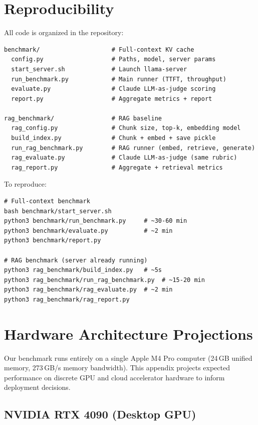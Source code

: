 \documentclass{article}
\begin{document}
\section{Reproducibility}
\label{app:reproduce}

All code is organized in the repository:

\begin{lstlisting}
benchmark/                    # Full-context KV cache
  config.py                   # Paths, model, server params
  start_server.sh             # Launch llama-server
  run_benchmark.py            # Main runner (TTFT, throughput)
  evaluate.py                 # Claude LLM-as-judge scoring
  report.py                   # Aggregate metrics + report

rag_benchmark/                # RAG baseline
  rag_config.py               # Chunk size, top-k, embedding model
  build_index.py              # Chunk + embed + save pickle
  run_rag_benchmark.py        # RAG runner (embed, retrieve, generate)
  rag_evaluate.py             # Claude LLM-as-judge (same rubric)
  rag_report.py               # Aggregate + retrieval metrics
\end{lstlisting}

To reproduce:
\begin{lstlisting}
# Full-context benchmark
bash benchmark/start_server.sh
python3 benchmark/run_benchmark.py     # ~30-60 min
python3 benchmark/evaluate.py          # ~2 min
python3 benchmark/report.py

# RAG benchmark (server already running)
python3 rag_benchmark/build_index.py   # ~5s
python3 rag_benchmark/run_rag_benchmark.py  # ~15-20 min
python3 rag_benchmark/rag_evaluate.py  # ~2 min
python3 rag_benchmark/rag_report.py
\end{lstlisting}

\section{Hardware Architecture Projections}
\label{app:hardware}

Our benchmark runs entirely on a single Apple M4 Pro computer (24\,GB unified
memory, 273\,GB/s memory bandwidth). This appendix projects expected
performance on discrete GPU and cloud accelerator hardware to inform
deployment decisions.

\subsection*{NVIDIA RTX 4090 (Desktop GPU)}
\end{document}

